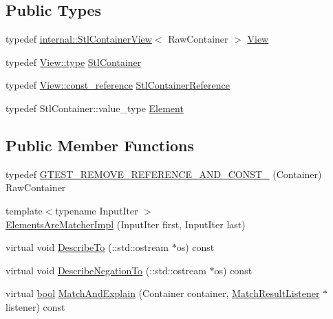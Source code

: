 \subsection*{Public Types}
\begin{DoxyCompactItemize}
\item 
typedef \hyperlink{classtesting_1_1internal_1_1StlContainerView}{internal\+::\+Stl\+Container\+View}$<$ Raw\+Container $>$ \hyperlink{classtesting_1_1internal_1_1ElementsAreMatcherImpl_a68c37c6cc56c047323543044445a5022}{View}
\item 
typedef \hyperlink{classtesting_1_1internal_1_1StlContainerView_a2b2c63a6dcdbfe63fb0ee121ebf463ba}{View\+::type} \hyperlink{classtesting_1_1internal_1_1ElementsAreMatcherImpl_a5897abb9a1dcf88afe04e14986ebe46f}{Stl\+Container}
\item 
typedef \hyperlink{classtesting_1_1internal_1_1StlContainerView_a9cd4f6ed689b3938cdb7b3c4cbf1b36b}{View\+::const\+\_\+reference} \hyperlink{classtesting_1_1internal_1_1ElementsAreMatcherImpl_ad5d20c1aa6e8c06c82fe3ac4d68c2278}{Stl\+Container\+Reference}
\item 
typedef Stl\+Container\+::value\+\_\+type \hyperlink{classtesting_1_1internal_1_1ElementsAreMatcherImpl_ab2ae88256ac950b69cd2af67b9820c87}{Element}
\end{DoxyCompactItemize}
\subsection*{Public Member Functions}
\begin{DoxyCompactItemize}
\item 
typedef \hyperlink{classtesting_1_1internal_1_1ElementsAreMatcherImpl_a9492f6be7fe09e26eb7c5c00ff18062b}{G\+T\+E\+S\+T\+\_\+\+R\+E\+M\+O\+V\+E\+\_\+\+R\+E\+F\+E\+R\+E\+N\+C\+E\+\_\+\+A\+N\+D\+\_\+\+C\+O\+N\+S\+T\+\_\+} (Container) Raw\+Container
\item 
{\footnotesize template$<$typename Input\+Iter $>$ }\\\hyperlink{classtesting_1_1internal_1_1ElementsAreMatcherImpl_abfe21bd90e0c085d4a171e22f1e2cc09}{Elements\+Are\+Matcher\+Impl} (Input\+Iter first, Input\+Iter last)
\item 
virtual void \hyperlink{classtesting_1_1internal_1_1ElementsAreMatcherImpl_a685f19f64b22a37317332d512c1bce52}{Describe\+To} (\+::std\+::ostream $\ast$os) const
\item 
virtual void \hyperlink{classtesting_1_1internal_1_1ElementsAreMatcherImpl_ab8485a836eb7ffabc43b05187e58616d}{Describe\+Negation\+To} (\+::std\+::ostream $\ast$os) const
\item 
virtual \hyperlink{classbool}{bool} \hyperlink{classtesting_1_1internal_1_1ElementsAreMatcherImpl_a6562159fa83e09417c3552fd881f878e}{Match\+And\+Explain} (Container container, \hyperlink{classtesting_1_1MatchResultListener}{Match\+Result\+Listener} $\ast$listener) const
\end{DoxyCompactItemize}
